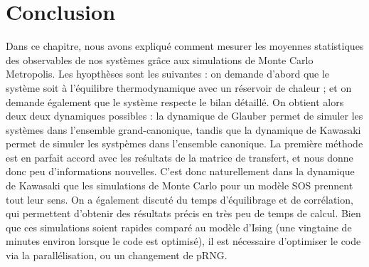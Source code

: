 \section{Conclusion}

Dans ce chapitre, nous avons expliqué comment mesurer les moyennes statistiques des observables de nos systèmes grâce aux simulations de Monte Carlo Metropolis. 
Les hyopthèses sont les suivantes : on demande d'abord que le système soit à l'équilibre thermodynamique avec un réservoir de chaleur ; et on demande également que le système respecte le bilan détaillé. On obtient alors deux deux dynamiques possibles : la dynamique de Glauber permet de simuler les systèmes dans l'ensemble grand-canonique, tandis que la dynamique de Kawasaki permet de simuler les systpèmes dans l'ensemble canonique.
La première méthode est en parfait accord avec les reśultats de la matrice de transfert, et nous donne donc peu d'informations nouvelles.  C'est donc naturellement dans la dynamique de Kawasaki que les simulations de Monte Carlo pour un modèle SOS prennent tout leur sens.
On a également discuté du temps d'équilibrage et de corrélation, qui permettent d'obtenir des résultats précis en très peu de temps de calcul. Bien que ces simulations soient rapides comparé au modèle d'Ising (une vingtaine de minutes environ lorsque le code est optimisé), il est nécessaire d'optimiser le code via la parallélisation, ou un changement de pRNG.